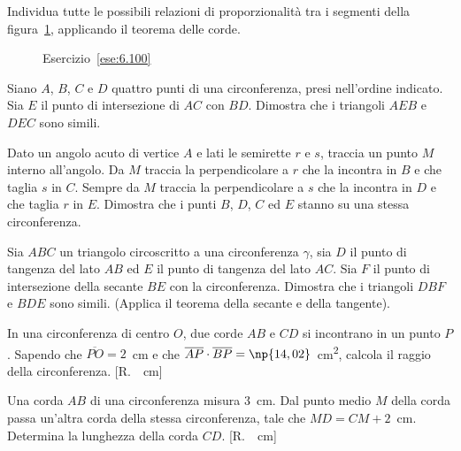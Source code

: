 \begin{esercizio}
\label{ese:6.100}
Individua tutte le possibili relazioni di proporzionalità tra i segmenti della figura~\ref{fig:ese6.100}, applicando il teorema delle corde.
\end{esercizio}

\begin{figure}[!htb]
	\centering
	\caption{Esercizio~\ref{ese:6.100}}\label{fig:ese6.100}
\end{figure}

\begin{esercizio}
\label{ese:6.101}
Siano $A$, $B$, $C$ e $D$ quattro punti di una circonferenza, presi nell'ordine indicato. Sia $E$ il punto di intersezione di $AC$ con $BD$. Dimostra che i triangoli $AEB$ e $DEC$ sono simili.
\end{esercizio}

\begin{esercizio}
\label{ese:6.102}
Dato un angolo acuto di vertice $A$ e lati le semirette $r$ e $s$, traccia un punto $M$ interno all'angolo. Da $M$ traccia la perpendicolare a $r$ che la incontra in $B$ e che taglia $s$ in $C$. Sempre da $M$ traccia la perpendicolare a $s$ che la incontra in $D$ e che taglia $r$ in $E$. Dimostra che i punti $B$, $D$, $C$ ed $E$ stanno su una stessa circonferenza. 
\end{esercizio}

\begin{esercizio}
\label{ese:6.103}
Sia $ABC$ un triangolo circoscritto a una circonferenza $\gamma$, sia $D$ il punto di tangenza del lato $AB$ ed $E$ il punto di tangenza del lato $AC$. Sia $F$ il punto di intersezione della secante $BE$ con la circonferenza. Dimostra che i triangoli $DBF$ e $BDE$ sono simili. (Applica il teorema della secante e della tangente).
\end{esercizio}

\begin{esercizio}
\label{ese:6.104}
In una circonferenza di centro $O$, due corde $AB$ e $CD$ si incontrano in un punto $P$. Sapendo che $\overline{PO}=2$~cm e che $\overline{AP}\cdot \overline{BP}=\np{14,02}$~cm\textsuperscript{2}, calcola il raggio della circonferenza. [R.~~cm]
\end{esercizio}

\begin{esercizio}
\label{ese:6.105}
Una corda $AB$ di una circonferenza misura 3~cm. Dal punto medio $M$ della corda passa un'altra corda della stessa circonferenza, tale che $MD=CM+2$~cm. Determina la lunghezza della corda $CD$. [R.~~cm]
\end{esercizio}

